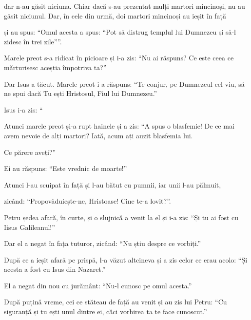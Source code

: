 {dar n-au găsit niciuna. Chiar dacă s-au prezentat mulți martori mincinoși, nu au găsit niciunul. Dar, în cele din urmă, doi martori mincinoși au ieșit în față

și au spus: “Omul acesta a spus: “Pot să distrug templul lui Dumnezeu și să-l zidesc în trei zile””.


\par }{\PP {}Marele preot s-a ridicat în picioare și i-a zis: “Nu ai răspuns? Ce este ceea ce mărturisesc aceștia împotriva ta?”

Dar Isus a tăcut. Marele preot i-a răspuns: “Te conjur, pe Dumnezeul cel viu, să ne spui dacă Tu ești Hristosul, Fiul lui Dumnezeu.”


\par }{\PP {}Isus i-a zis: “{}


\par }{\PP {}Atunci marele preot și-a rupt hainele și a zis: “A spus o blasfemie! De ce mai avem nevoie de alți martori? Iată, acum ați auzit blasfemia lui.

Ce părere aveți?”

\par }{\PP Ei au răspuns: “Este vrednic de moarte!”

Atunci l-au scuipat în față și l-au bătut cu pumnii, iar unii l-au pălmuit,

zicând: “Propovăduiește-ne, Hristoase! Cine te-a lovit?”.


\par }{\PP {}Petru ședea afară, în curte, și o slujnică a venit la el și i-a zis: “Și tu ai fost cu Iisus Galileanul!”


\par }{\PP {}Dar el a negat în fața tuturor, zicând: “Nu știu despre ce vorbiți.”


\par }{\PP {}După ce a ieșit afară pe prispă, l-a văzut altcineva și a zis celor ce erau acolo: “Și acesta a fost cu Isus din Nazaret.”


\par }{\PP {}El a negat din nou cu jurământ: “Nu-l cunosc pe omul acesta.”


\par }{\PP {}După puțină vreme, cei ce stăteau de față au venit și au zis lui Petru: “Cu siguranță și tu ești unul dintre ei, căci vorbirea ta te face cunoscut.”


}
